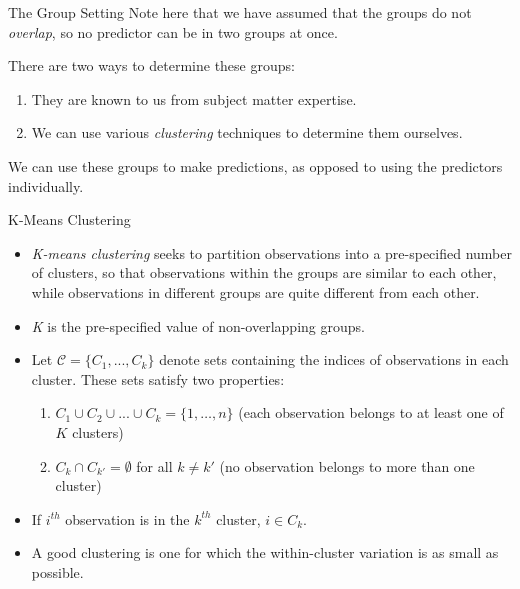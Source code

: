 \documentclass[8pt]{beamer}
\newcommand{\mydef}[1]{\textcolor{SteelBlue3}{\textit{#1}}} %
\begin{document}
\begin{frame}{The Group Setting}
Note here that we have assumed that the groups do not \mydef{overlap}, so no predictor can be in two groups at once. %

There are two ways to determine these groups: %
\begin{enumerate}
    \item They are known to us from subject matter expertise. %
    \item We can use various \mydef{clustering} techniques to determine them ourselves. %
\end{enumerate}

We can use these groups to make predictions, as opposed to using the predictors individually.

\end{frame}

\begin{frame}{K-Means Clustering}

\begin{itemize}

\item \emph{K-means clustering} seeks to partition observations into a pre-specified number of clusters, so that observations within the groups are similar to each other, while observations in different groups are quite different from each other. 

\item \emph{K} is the pre-specified value of non-overlapping groups. 

\item Let $\mathcal{C} = \{ C_{1},..., C_{k} \}$ denote sets containing the indices of observations in each cluster. These sets satisfy two properties:

\begin{enumerate}
    \item $C_{1} \cup C_{2} \cup ... \cup C_{k} = \{1,\ldots,n\}$  (each observation belongs to at least one of $K$ clusters)
    
    \item $C_{k} \cap C_{k'} = \emptyset  $ for all $k \neq k'$ (no observation belongs to more than one cluster)
\end{enumerate}

\item If $i^{th}$ observation is in the $k^{th}$ cluster, $i \in C_{k}$.

\item A good clustering is one for which the within-cluster variation is as small as possible. 

\end{itemize}
\end{frame}
\end{document}
